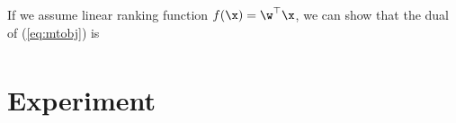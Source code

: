 If we assume linear ranking function $f(\x) = \w^\top \x$, we can show that the dual of (\ref{eq:mtobj}) is
\begin{equation}
\label{eq:mtdual}
\begin{aligned}
\end{aligned}
\end{equation}


\section{Experiment}
